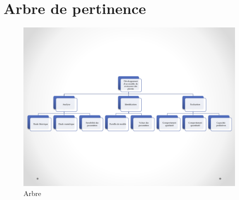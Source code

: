 \section{Arbre de pertinence}

\begin{figure}[h]
  \includegraphics[scale=0.51]{./annexes/arbre_de_pertinence.pdf}
  \caption{Arbre}
  \label{fig:arbre_de_pertinence}
\end{figure}
